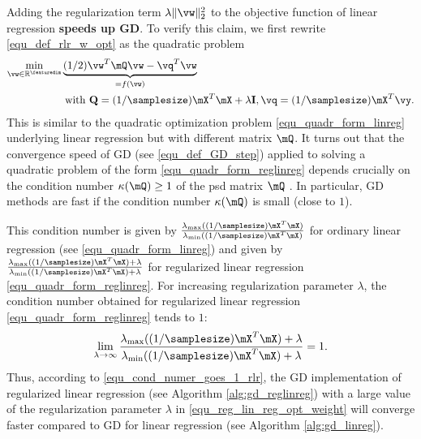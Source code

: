 \documentclass[12pt]{report}
\begin{document}
Adding the regularization term $\lambda \| \vw \|^{2}_{2}$ to the objective 
function of linear regression {\bf speeds up GD}. To verify this claim, we first 
rewrite \eqref{equ_def_rlr_w_opt} as the quadratic problem 
\begin{align} 
\label{equ_quadr_form_reglinreg}
\min_{\vw \in \mathbb{R}^{\featuredim}} & \underbrace{(1/2) \vw^{T} \mQ \vw - \vq^{T}  \vw}_{= f(\vw)} \nonumber \\ 
 & \mbox{ with } \mathbf{Q}= (1/\samplesize) \mX^{T} \mX + \lambda \mathbf{I}, \vq =(1/\samplesize) \mX^{T} \vy. %
\end{align} 
This is similar to the quadratic optimization problem \eqref{equ_quadr_form_linreg} 
underlying linear regression but with different matrix $\mQ$. It turns out 
that the convergence speed of GD (see \eqref{equ_def_GD_step}) applied 
to solving a quadratic problem of the form \eqref{equ_quadr_form_reglinreg} 
depends crucially on the condition number $\kappa(\mQ) \geq 1$ of the 
psd matrix $\mQ$ \cite{JungFixedPoint}. In particular, GD methods are fast 
if the condition number $\kappa(\mQ)$ is small (close to $1$). 

This condition number is given by $\frac{\lambda_{\rm max}((1/\samplesize) \mX^{T} \mX)} {\lambda_{\rm min}((1/\samplesize) \mX^{T} \mX)}$ for ordinary linear regression 
(see \eqref{equ_quadr_form_linreg}) and given by $\frac{\lambda_{\rm max}((1/\samplesize)\mX^{T} \mX) + \lambda} {\lambda_{\rm min}((1/\samplesize)\mX^{T} \mX)+ \lambda}$ 
for regularized linear regression \eqref{equ_quadr_form_reglinreg}. For increasing 
regularization parameter $\lambda$, the condition number obtained for regularized 
linear regression \eqref{equ_quadr_form_reglinreg} tends to $1$: 
\begin{equation}
\label{equ_cond_numer_goes_1_rlr}
\lim_{\lambda \rightarrow \infty} \frac{\lambda_{\rm max}((1/\samplesize)\mX^{T} \mX) + \lambda} {\lambda_{\rm min}((1/\samplesize)\mX^{T} \mX)+ \lambda} =1. 
\end{equation} 
Thus, according to \eqref{equ_cond_numer_goes_1_rlr}, the GD 
implementation of regularized linear regression (see Algorithm \ref{alg:gd_reglinreg}) 
with a large value of the regularization parameter $\lambda$ 
in \eqref{equ_reg_lin_reg_opt_weight} will converge faster compared 
to GD for linear regression (see Algorithm \ref{alg:gd_linreg}). 
\end{document}
